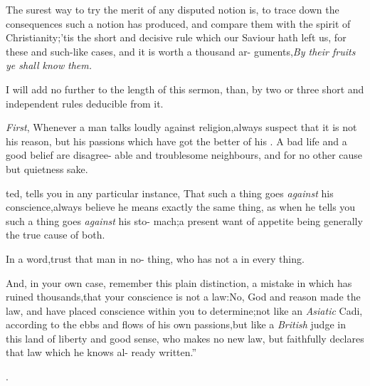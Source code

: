 \documentclass{article}
\begin{document}
\lqq The surest way to try the merit of\break
\lqq any disputed notion is, to trace down\break
\lqq the consequences such a notion has\break
\lqq produced, and compare them with the\break
\lqq spirit of Christianity;\tsh ’tis the short\break
\lqq and decisive rule which our Saviour\break
\lqq hath left us, for these and such-like\break
\lqq cases, and it is worth a thousand ar-\break
\lqq guments,\tsk \textit{By their fruits ye shall know}\break
\lqq \textit{them.} 

\lqq I will add no further to the length\break
\lqq of this sermon, than, by two or three
\lqq short and independent rules deducible\break
\lqq from it.

\lqq \textit{First}, Whenever a man talks loudly\break
\lqq against religion,\tsk always suspect that it\break
\lqq is not his reason, but his passions which\break
\lqq have got the better of his . A\break
\lqq bad life and a good belief are disagree-\break
\lqq able and troublesome neighbours, and\break
\lqq {}\break
\lqq for no other cause but quietness sake.

\lqq {}\break
\lqq ted, tells you in any particular instance,\break
\lqq \tsk That such a thing goes \textit{against} his\break
\lqq conscience,\tsk always believe he means\break
\lqq exactly the same thing, as when he tells\break
\lqq you such a thing goes \textit{against} his sto-\break
\lqq mach;\tsk a present want of appetite\break
\lqq being generally the true cause of both.


\lqq In a word,\tsk trust that man in no-\break
\lqq thing, who has not a  in\break
\lqq every thing.

\lqq And, in your own case, remember\break
\lqq this plain distinction, a mistake in\break
\lqq which has ruined thousands,\tsk that\break
\lqq your conscience is not a law:\tsk No,\break
\lqq God and reason made the law, and\break
\lqq have placed conscience within you to\break
\lqq determine;\tsh not like an \textit{Asiatic} Cadi,\break
\lqq according to the ebbs and flows of his\break
\lqq own passions,\tsk but like a \textit{British} judge\break
\lqq in this land of liberty and good sense,\break
\lqq who makes no new law, but faithfully\break
\lqq declares that law which he knows al-\break
\lqq ready written.”

\bigskip

\centerline{.}
\end{document}
